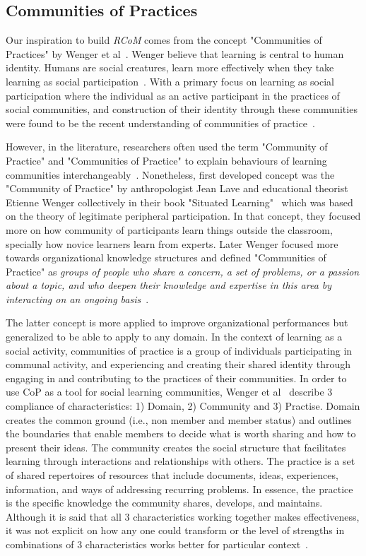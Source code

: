 \documentclass[format=acmsmall, review=false, screen=true]{acmart}
\begin{document}
\subsection{Communities of Practices}
Our inspiration to build \textit{RCoM} comes from the concept "Communities of Practices" by Wenger et al~\cite{wenger2010communities}. Wenger believe that learning is central to human identity. Humans are social creatures, learn more effectively when they take learning as social participation~\cite{gauvain2007socialization}. With a primary focus on learning as social participation where the individual as an active participant in the practices of social communities, and construction of their identity through these communities were found to be the recent understanding of communities of practice~\cite{wenger2002cultivating}. 

However, in the literature, researchers often used the term "Community of Practice" and "Communities of Practice" to explain behaviours of learning communities interchangeably~\cite{rogers2000communities}. Nonetheless, first developed concept was the "Community of Practice" by anthropologist Jean Lave and educational theorist Etienne Wenger collectively in their book "Situated Learning"~\cite{lave1991situated} which was based on the theory of legitimate peripheral participation. In that concept, they focused more on how community of participants learn things outside the classroom, specially how novice learners learn from experts. Later Wenger focused more towards organizational knowledge structures and defined "Communities of Practice" as \textit{groups of people who share a concern, a set of problems, or a passion about a topic, and who deepen their knowledge and expertise in this area by interacting on an ongoing basis}~\cite{wenger2002cultivating}. 

The latter concept is more applied to improve organizational performances but generalized to be able to apply to any domain. In the context of learning as a social activity, communities of practice is a group of individuals participating in communal activity, and experiencing and creating their shared identity through engaging in and contributing to the practices of their communities. In order to use CoP as a tool for social learning communities, Wenger et al~\cite{wenger2010communities} describe 3 compliance of characteristics: 1) Domain, 2) Community and 3) Practise. Domain creates the common ground (i.e., non member and member status) and outlines the boundaries that enable members to decide what is worth sharing and how to present their ideas. The community creates the social structure that facilitates learning through interactions and relationships with others. The practice is a set of shared repertoires of resources that include documents, ideas, experiences, information, and ways of addressing recurring problems. In essence, the practice is the specific knowledge the community shares, develops, and maintains. Although it is said that all 3 characteristics working together makes effectiveness, it was not explicit on how any one could transform or the level of strengths in combinations of 3 characteristics works better for particular context~\cite{li2009evolution}. 
\end{document}
